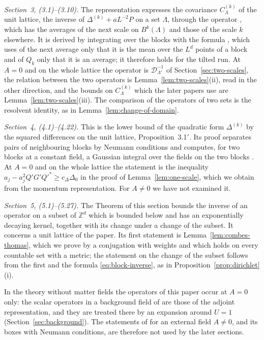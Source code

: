 \documentclass[11pt]{preprint}
\numberwithin{equation}{section}
\theoremstyle{definition}
\theoremstyle{remark}
\theoremstyle{plain}
\begin{document}
\emph{Section~3, (3.1)--(3.10).} The representation \cite[(3.6)]{BalabanRDG} expresses the covariance $C^{(k)}_\Lambda$ of the unit lattice, the inverse of $\Delta^{(k)} + aL^{-2}P$ on a set $\Lambda$, through the operator \cite[(3.5)]{BalabanRDG}, which has the averages of the next scale on $B^k(\Lambda)$ and those of the scale $k$ elsewhere. It is derived by integrating over the blocks with the formula \cite[(3.3)]{BalabanRDG}, which uses of the next average only that it is the mean over the $L^d$ points of a block and of $Q_k$ only that it is an average; it therefore holds for the tilted run. At $A = 0$ and on the whole lattice the operator \cite[(3.5)]{BalabanRDG} is $\mathcal D_{\Lambda'}^{-1}$ of Section~\ref{sec:two-scales}, the relation between the two operators is Lemma~\ref{lem:two-scales}(ii), read in the other direction, and the bounds on $C^{(k)}_\Lambda$ which the later papers use are Lemma~\ref{lem:two-scales}(iii). The comparison \cite[(3.9), (3.10)]{BalabanRDG} of the operators of two sets is the resolvent identity, as in Lemma~\ref{lem:change-of-domain}.

\emph{Section~4, (4.1)--(4.22).} This is the lower bound of the quadratic form $\Delta^{(k)}$ by the squared differences on the unit lattice, Proposition~3.1$'$. Its proof separates pairs of neighbouring blocks by Neumann conditions and computes, for two blocks at a constant field, a Gaussian integral over the fields on the two blocks \cite[(4.14)--(4.22)]{BalabanRDG}. At $A = 0$ and on the whole lattice the statement is the inequality $a_j - a_j^2Q'G'Q'^* \geq c_\Delta\Delta_0$ in the proof of Lemma~\ref{lem:one-scale}, which we obtain from the momentum representation. For $A \neq 0$ we have not examined it.

\emph{Section~5, (5.1)--(5.27).} The Theorem of this section bounds the inverse of an operator on a subset of $\mathbb Z^d$ which is bounded below and has an exponentially decaying kernel, together with its change under a change of the subset. It concerns a unit lattice of the paper. Its first statement \cite[(5.7)]{BalabanRDG} is Lemma~\ref{lem:combes-thomas}, which we prove by a conjugation with weights and which holds on every countable set with a metric; the statement \cite[(5.8)]{BalabanRDG} on the change of the subset follows from the first and the formula \eqref{eq:block-inverse}, as in Proposition~\ref{prop:dirichlet}(i).

In the theory without matter fields the operators of this paper occur at $A = 0$ only: the scalar operators in a background field of \cite{BalabanPBG} are those of the adjoint representation, and they are treated there by an expansion around $U = 1$ (Section~\ref{sec:background}). The statements of \cite{BalabanRDG} for an external field $A \neq 0$, and its boxes with Neumann conditions, are therefore not used by the later sections.
\end{document}
